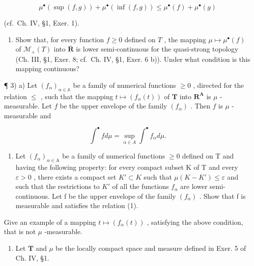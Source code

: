 \[
\mu^ {\bullet} (\sup (f, g)) + \mu^ {\bullet} (\inf (f, g)) \leqslant \mu^ {\bullet} (f) + \mu^ {\bullet} (g)
\]

(cf.~Ch. IV, §1, Exer. 1).

\begin{enumerate}
\def\labelenumi{\arabic{enumi})}
\setcounter{enumi}{1}
\tightlist
\item
  Show that, for every function \(f \geqslant 0\) defined on \(T\) , the mapping \(\mu \mapsto \mu^{\bullet}(f)\) of \(\mathcal{M}_{+}(T)\) into \(\overline{\mathbf{R}}\) is lower semi-continuous for the quasi-strong topology (Ch. III, §1, Exer. 8; cf.~Ch. IV, §1, Exer. 6 b)). Under what condition is this mapping continuous?
\end{enumerate}

¶ 3) a) Let \((f_{\alpha})_{\alpha \in \mathbb{A}}\) be a family of numerical functions \(\geqslant 0\) , directed for the relation \(\leqslant\) , such that the mapping \(t \mapsto (f_{\alpha}(t))\) of \(\mathbf{T}\) into \(\mathbf{R}^{\mathbf{A}}\) is \(\mu\) -measurable. Let \(f\) be the upper envelope of the family \((f_{\alpha})\) . Then \(f\) is \(\mu\) -measurable and

\[
\int^ {\bullet} f d \mu = \sup _ {\alpha \in A} \int^ {\bullet} f _ {\alpha} d \mu .\tag{1}
\]

\begin{enumerate}
\def\labelenumi{\alph{enumi})}
\setcounter{enumi}{1}
\tightlist
\item
  Let \((f_{\alpha})_{\alpha\in\mathrm{A}}\) be a family of numerical functions \(\geqslant0\) defined on T and having the following property: for every compact subset K of T and every \(\varepsilon>0\) , there exists a compact set \(K'\subset K\) such that \(\mu(K-K')\leqslant\varepsilon\) and such that the restrictions to \(K'\) of all the functions \(f_{\alpha}\) are lower semi-continuous. Let f be the upper envelope of the family \((f_{\alpha})\) . Show that f is measurable and satisfies the relation (1).
\end{enumerate}

Give an example of a mapping \(t \mapsto (f_{\alpha}(t))\) , satisfying the above condition, that is not \(\mu\) -measurable.

\begin{enumerate}
\def\labelenumi{\arabic{enumi})}
\setcounter{enumi}{3}
\tightlist
\item
  Let \(\mathbf{T}\) and \(\mu\) be the locally compact space and measure defined in Exer. 5 of Ch. IV, §1.
\end{enumerate}

